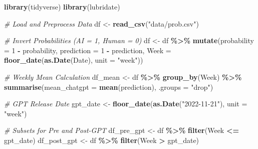 \documentclass[
]{article}
\newenvironment{Shaded}{\begin{snugshade}}{\end{snugshade}}
\newcommand{\AttributeTok}[1]{\textcolor[rgb]{0.13,0.29,0.53}{#1}}
\newcommand{\CommentTok}[1]{\textcolor[rgb]{0.56,0.35,0.01}{\textit{#1}}}
\newcommand{\DecValTok}[1]{\textcolor[rgb]{0.00,0.00,0.81}{#1}}
\newcommand{\FunctionTok}[1]{\textcolor[rgb]{0.13,0.29,0.53}{\textbf{#1}}}
\newcommand{\NormalTok}[1]{#1}
\newcommand{\OtherTok}[1]{\textcolor[rgb]{0.56,0.35,0.01}{#1}}
\newcommand{\SpecialCharTok}[1]{\textcolor[rgb]{0.81,0.36,0.00}{\textbf{#1}}}
\newcommand{\StringTok}[1]{\textcolor[rgb]{0.31,0.60,0.02}{#1}}
\begin{document}
\begin{Shaded}
\begin{Highlighting}[]
\FunctionTok{library}\NormalTok{(tidyverse)}
\FunctionTok{library}\NormalTok{(lubridate)}

\CommentTok{\# Load and Preprocess Data}
\NormalTok{df }\OtherTok{\textless{}{-}} \FunctionTok{read\_csv}\NormalTok{(}\StringTok{"data/prob.csv"}\NormalTok{)}

\CommentTok{\# Invert Probabilities (AI = 1, Human = 0)}
\NormalTok{df }\OtherTok{\textless{}{-}}\NormalTok{ df }\SpecialCharTok{\%\textgreater{}\%}
  \FunctionTok{mutate}\NormalTok{(}\AttributeTok{probability =} \DecValTok{1} \SpecialCharTok{{-}}\NormalTok{ probability,}
         \AttributeTok{prediction =} \DecValTok{1} \SpecialCharTok{{-}}\NormalTok{ prediction,}
         \AttributeTok{Week =} \FunctionTok{floor\_date}\NormalTok{(}\FunctionTok{as.Date}\NormalTok{(Date), }\AttributeTok{unit =} \StringTok{"week"}\NormalTok{))}

\CommentTok{\# Weekly Mean Calculation}
\NormalTok{df\_mean }\OtherTok{\textless{}{-}}\NormalTok{ df }\SpecialCharTok{\%\textgreater{}\%}
  \FunctionTok{group\_by}\NormalTok{(Week) }\SpecialCharTok{\%\textgreater{}\%}
  \FunctionTok{summarise}\NormalTok{(}\AttributeTok{mean\_chatgpt =} \FunctionTok{mean}\NormalTok{(prediction), }\AttributeTok{.groups =} \StringTok{"drop"}\NormalTok{)}

\CommentTok{\# GPT Release Date}
\NormalTok{gpt\_date }\OtherTok{\textless{}{-}} \FunctionTok{floor\_date}\NormalTok{(}\FunctionTok{as.Date}\NormalTok{(}\StringTok{"2022{-}11{-}21"}\NormalTok{), }\AttributeTok{unit =} \StringTok{"week"}\NormalTok{)}

\CommentTok{\# Subsets for Pre and Post{-}GPT}
\NormalTok{df\_pre\_gpt }\OtherTok{\textless{}{-}}\NormalTok{ df }\SpecialCharTok{\%\textgreater{}\%} \FunctionTok{filter}\NormalTok{(Week }\SpecialCharTok{\textless{}=}\NormalTok{ gpt\_date)}
\NormalTok{df\_post\_gpt }\OtherTok{\textless{}{-}}\NormalTok{ df }\SpecialCharTok{\%\textgreater{}\%} \FunctionTok{filter}\NormalTok{(Week }\SpecialCharTok{\textgreater{}}\NormalTok{ gpt\_date)}


\end{Highlighting}
\end{Shaded}
\end{document}
